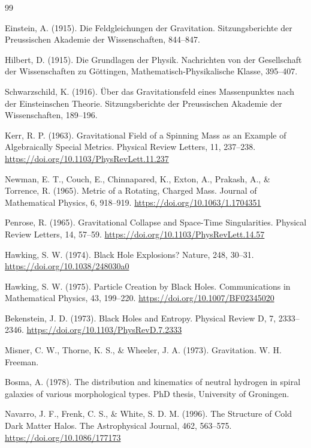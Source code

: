 	\begin{thebibliography}{99}
		
		Einstein, A. (1915). Die Feldgleichungen der Gravitation. Sitzungsberichte der Preussischen Akademie der Wissenschaften, 844–847.
		
		Hilbert, D. (1915). Die Grundlagen der Physik. Nachrichten von der Gesellschaft der Wissenschaften zu Göttingen, Mathematisch-Physikalische Klasse, 395–407.
		
		Schwarzschild, K. (1916). Über das Gravitationsfeld eines Massenpunktes nach der Einsteinschen Theorie. Sitzungsberichte der Preussischen Akademie der Wissenschaften, 189–196.
		
		Kerr, R. P. (1963). Gravitational Field of a Spinning Mass as an Example of Algebraically Special Metrics. Physical Review Letters, 11, 237–238. \url{https://doi.org/10.1103/PhysRevLett.11.237}
		
		Newman, E. T., Couch, E., Chinnapared, K., Exton, A., Prakash, A., \& Torrence, R. (1965). Metric of a Rotating, Charged Mass. Journal of Mathematical Physics, 6, 918–919. \url{https://doi.org/10.1063/1.1704351}
		
		Penrose, R. (1965). Gravitational Collapse and Space-Time Singularities. Physical Review Letters, 14, 57–59. \url{https://doi.org/10.1103/PhysRevLett.14.57}
		
		Hawking, S. W. (1974). Black Hole Explosions? Nature, 248, 30–31. \url{https://doi.org/10.1038/248030a0}
		
		Hawking, S. W. (1975). Particle Creation by Black Holes. Communications in Mathematical Physics, 43, 199–220. \url{https://doi.org/10.1007/BF02345020}
		
		Bekenstein, J. D. (1973). Black Holes and Entropy. Physical Review D, 7, 2333–2346. \url{https://doi.org/10.1103/PhysRevD.7.2333}
		
		Misner, C. W., Thorne, K. S., \& Wheeler, J. A. (1973). Gravitation. W. H. Freeman.
		
		Bosma, A. (1978). The distribution and kinematics of neutral hydrogen in spiral galaxies of various morphological types. PhD thesis, University of Groningen.
		
		Navarro, J. F., Frenk, C. S., \& White, S. D. M. (1996). The Structure of Cold Dark Matter Halos. The Astrophysical Journal, 462, 563–575. \url{https://doi.org/10.1086/177173}
		

\end{thebibliography}
